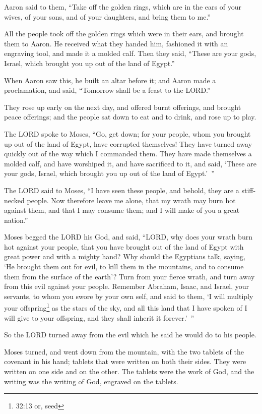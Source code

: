 \myverse{}Aaron said to them, “Take off the golden rings, which are in the
ears of your wives, of your sons, and of your daughters, and bring them to me.”


\myverse{}All the people took off the golden rings which were in their ears,
and brought them to Aaron.
\myverse{}He received what they handed him, fashioned it with an engraving tool, and
made it a molded calf. Then they said, “These are your gods, Israel, which brought you up out of the land
of Egypt.”


\myverse{}When Aaron saw this, he built an altar before it; and Aaron made
a proclamation, and said, “Tomorrow shall be a feast to the LORD.”


\myverse{}They rose up early on the next day, and offered burnt offerings,
and brought peace offerings; and the people sat down to eat and to drink, and rose up to play.


\myverse{}The LORD spoke to Moses, “Go, get down; for your people, whom
you brought up out of the land of Egypt, have corrupted themselves!
\myverse{}They have turned away quickly out of the way which I commanded them. They have
made themselves a molded calf, and have worshiped it, and have sacrificed to it, and said, ‘These are
your gods, Israel, which brought you up out of the land of Egypt.’ ”


\myverse{}The LORD said to Moses, “I have seen these people, and behold,
they are a stiff-necked people.
\myverse{}Now therefore leave me alone, that my wrath may burn hot against them, and
that I may consume them; and I will make of you a great nation.”


\myverse{}Moses begged the LORD his God, and said, “LORD, why does your
wrath burn hot against your people, that you have brought out of the land of Egypt with great power and
with a mighty hand?
\myverse{}Why should the Egyptians talk, saying, ‘He brought them out for evil, to
kill them in the mountains, and to consume them from the surface of the earth’? Turn from your fierce
wrath, and turn away from this evil against your people.
\myverse{}Remember Abraham, Isaac, and Israel, your servants, to whom you swore by
your own self, and said to them, ‘I will multiply your offspring\footnote{32:13 or, seed} as the stars of the sky, and all this land that I have spoken of I will give
to your offspring, and they shall inherit it forever.’ ”


\myverse{}So the LORD turned away from the evil which he said he would
do to his people.


\myverse{}Moses turned, and went down from the mountain, with the two
tablets of the covenant in his hand; tablets that were written on both their sides. They were written
on one side and on the other.
\myverse{}The tablets were the work of God, and the writing was the writing of God,
engraved on the tablets.


